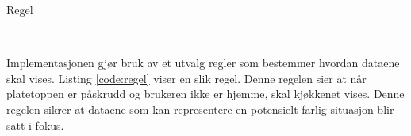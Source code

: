 \begin{listing}[ht]
\caption{Regel}
\inputminted[fontsize=\footnotesize, linenos]{clj}{kodesnutter/rule.clj}
\label{code:regel}
\end{listing}
\\Implementasjonen gjør bruk av et utvalg regler som bestemmer hvordan dataene skal vises. Listing \ref{code:regel} viser en slik regel. Denne regelen sier at når platetoppen er påskrudd og brukeren ikke er hjemme, skal kjøkkenet vises. Denne regelen sikrer at dataene som kan representere en potensielt farlig situasjon blir satt i fokus.









